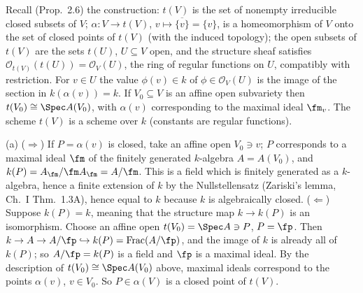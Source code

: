\documentclass[11pt]{article}
\begin{document}
\pf
Recall (Prop.~2.6) the construction: $t(V)$ is the set of nonempty irreducible closed subsets of $V$; $\alpha:V\to t(V)$, $v\mapsto\overline{\{v\}}=\{v\}$, is a homeomorphism of $V$ onto the set of closed points of $t(V)$ (with the induced topology); the open subsets of $t(V)$ are the sets $t(U)$, $U\subseteq V$ open, and the structure sheaf satisfies $\mathcal O_{t(V)}(t(U))=\mathcal O_V(U)$, the ring of regular functions on $U$, compatibly with restriction. For $v\in U$ the value $\phi(v)\in k$ of $\phi\in\mathcal O_V(U)$ is the image of the section in $k(\alpha(v))=k$. If $V_0\subseteq V$ is an affine open subvariety then $t(V_0)\cong\Spec A(V_0)$, with $\alpha(v)$ corresponding to the maximal ideal $\fm_v$. The scheme $t(V)$ is a scheme over $k$ (constants are regular functions).

(a) ($\Rightarrow$) If $P=\alpha(v)$ is closed, take an affine open $V_0\ni v$; $P$ corresponds to a maximal ideal $\fm$ of the finitely generated $k$-algebra $A=A(V_0)$, and $k(P)=A_\fm/\fm A_\fm=A/\fm$. This is a field which is finitely generated as a $k$-algebra, hence a finite extension of $k$ by the Nullstellensatz (Zariski's lemma, Ch.~I Thm.~1.3A), hence equal to $k$ because $k$ is algebraically closed.
($\Leftarrow$) Suppose $k(P)=k$, meaning that the structure map $k\to k(P)$ is an isomorphism. Choose an affine open $t(V_0)=\Spec A\ni P$, $P=\fp$. Then $k\to A\to A/\fp\hookrightarrow k(P)=\operatorname{Frac}(A/\fp)$, and the image of $k$ is already all of $k(P)$; so $A/\fp=k(P)$ is a field and $\fp$ is a maximal ideal. By the description of $t(V_0)\cong\Spec A(V_0)$ above, maximal ideals correspond to the points $\alpha(v)$, $v\in V_0$. So $P\in\alpha(V)$ is a closed point of $t(V)$.
\end{document}
